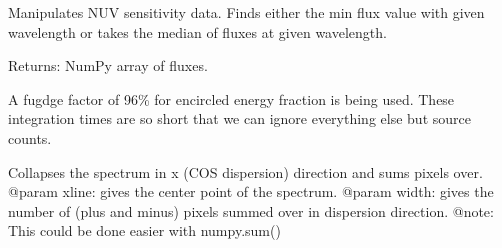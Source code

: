\documentclass[letterpaper,10pt,english]{sphinxmanual}
\begin{document}

\begin{fulllineitems}
\label{SamPy.plot.COSIHB:SamPy.plot.COSIHB.wrapperSynphot.NUVSensitivityDataMod2}
Manipulates NUV sensitivity data. Finds either the min flux 
value with given wavelength or takes the median of fluxes
at given wavelength.

\end{fulllineitems}



\begin{fulllineitems}
\label{SamPy.plot.COSIHB:SamPy.plot.COSIHB.wrapperSynphot.STMagToFlux}
Returns:
NumPy array of fluxes.

\end{fulllineitems}



\begin{fulllineitems}
\label{SamPy.plot.COSIHB:SamPy.plot.COSIHB.wrapperSynphot.calculateSTMAGlim}
A fugdge factor of 96\% for encircled energy fraction is being used.
These integration times are so short that we can ignore everything
else but source counts.

\end{fulllineitems}



\begin{fulllineitems}
\label{SamPy.plot.COSIHB:SamPy.plot.COSIHB.wrapperSynphot.collapseSpectrumX}
Collapses the spectrum in x (COS dispersion) direction and 
sums pixels over.
@param xline: gives the center point of the spectrum.
@param width: gives the number of (plus and minus) pixels summed 
over in dispersion direction.
@note: This could be done easier with numpy.sum()

\end{fulllineitems}
\end{document}
